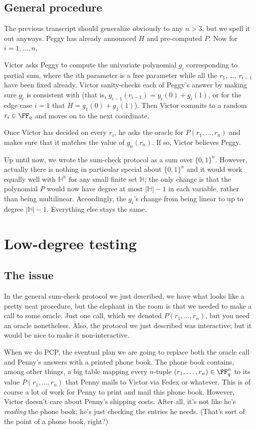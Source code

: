 \documentclass[11pt]{scrreprt}
\newcommand{\HH}{\mathbb H}
\begin{document}
\subsection{General procedure}
The previous transcript should generalize obviously to any $n > 3$,
but we spell it out anyways.
Peggy has already announced $H$ and pre-computed $P$.
Now for $i = 1, \dots, n$,
\begin{itemize}
\ii Victor asks Peggy to compute the univariate polynomial $g_i$
corresponding to partial sum, where the $i$th parameter is a free parameter
while all the $r_1$, \dots, $r_{i-1}$ have been fixed already.
\ii Victor sanity-checks each of Peggy's answer by making sure $g_i$ is consistent
with (that is, $g_{i-1}(r_{i-1}) = g_i(0) + g_i(1)$,
or for the edge case $i=1$ that $H = g_1(0) + g_1(1)$).
\ii Then Victor commits to a random $r_i \in \FF_q$ and moves on to the next coordinate.
\end{itemize}
Once Victor has decided on every $r_i$, he asks the oracle for $P(r_1, \dots, r_n)$
and makes sure that it matches the value of $g_n(r_n)$.
If so, Victor believes Peggy.

Up until now, we wrote the sum-check protocol as a sum over $\{0,1\}^n$.
However, actually there is nothing in particular special about $\{0,1\}^n$
and it would work equally well with $\HH^n$ for any small finite set $\HH$;
the only change is that the polynomial $P$
would now have degree at most $|\HH|-1$ in each variable,
rather than being multilinear.
Accordingly, the $g_i$'s change from being linear to up to degree $|\HH|-1$.
Everything else stays the same.

\section{Low-degree testing}
\subsection{The issue}
In the general sum-check protocol we just described,
we have what looks like a pretty neat procedure,
but the elephant in the room is that we needed to make a call to some oracle.
Just one call, which we denoted $P(r_1, \dots, r_n)$, but you need an oracle nonetheless.
Also, the protocol we just described was interactive;
but it would be nice to make it non-interactive.

When we do PCP, the eventual plan
we are going to replace both the oracle call and Penny's answers
with a printed phone book.
The phone book contains, among other things, a big table mapping every $n$-tuple
$(r_1, \dots, r_n) \in \FF_q^n$ to its value $P(r_1, \dots, r_n)$
that Penny mails to Victor via Fedex or whatever.
This is of course a lot of work for Penny to print and mail this phone book.
However, Victor doesn't care about Penny's shipping costs.
After all, it's not like he's \emph{reading} the phone book;
he's just checking the entries he needs.
(That's sort of the point of a phone book, right?)
\end{document}
